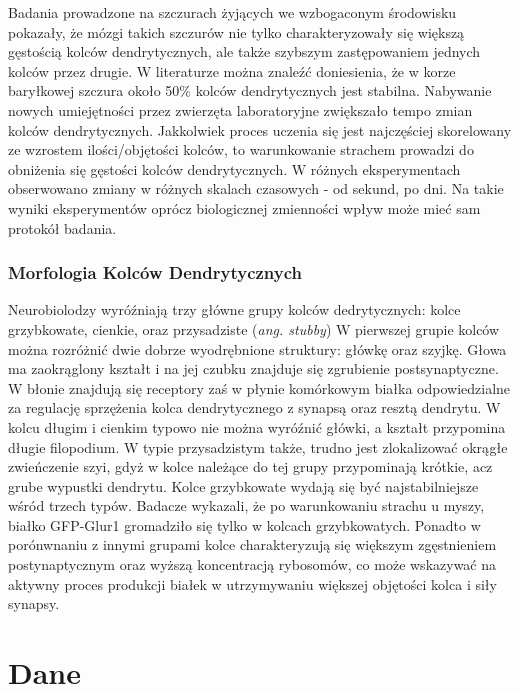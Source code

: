 \documentclass{article}
\begin{document}
Badania prowadzone na szczurach żyjących we wzbogaconym środowisku pokazały, że mózgi takich szczurów nie tylko charakteryzowały się większą gęstością kolców dendrytycznych, ale także szybszym zastępowaniem jednych kolców przez drugie.
W literaturze\citep{Sala2014} można znaleźć doniesienia, że w korze baryłkowej szczura około 50\% kolców dendrytycznych jest stabilna.
Nabywanie nowych umiejętności przez zwierzęta laboratoryjne zwiększało tempo zmian kolców dendrytycznych.
Jakkolwiek proces uczenia się jest najczęściej skorelowany ze wzrostem ilości/objętości kolców, to warunkowanie strachem prowadzi do obniżenia się gęstości kolców dendrytycznych.
W różnych eksperymentach obserwowano zmiany w różnych skalach czasowych - od sekund, po dni.
Na takie wyniki eksperymentów oprócz biologicznej zmienności wpływ może mieć sam protokół badania.


\subsubsection{Morfologia Kolców Dendrytycznych}
Neurobiolodzy wyróźniają trzy główne grupy kolców dedrytycznych: kolce grzybkowate, cienkie, oraz przysadziste (\emph{ang. stubby})
W pierwszej grupie kolców można rozróżnić dwie dobrze wyodrębnione struktury: główkę oraz szyjkę.
Głowa ma zaokrąglony kształt i na jej czubku znajduje się zgrubienie postsynaptyczne.
W błonie znajdują się receptory zaś w płynie komórkowym białka odpowiedzialne za regulację sprzężenia kolca dendrytycznego z synapsą oraz resztą dendrytu. %
W kolcu długim i cienkim typowo nie można wyróźnić główki, a kształt przypomina długie filopodium.
W typie przysadzistym także, trudno jest zlokalizować okrągłe zwieńczenie szyi, gdyż w kolce należące do tej grupy przypominają krótkie, acz grube wypustki dendrytu. %
Kolce grzybkowate wydają się być najstabilniejsze wśród trzech typów.
Badacze wykazali, że po warunkowaniu strachu u myszy, białko GFP-Glur1 gromadziło się tylko w kolcach grzybkowatych.
Ponadto w porónwnaniu z innymi grupami kolce charakteryzują się większym zgęstnieniem postynaptycznym oraz wyższą koncentracją rybosomów, co może wskazywać na aktywny proces produkcji białek w utrzymywaniu większej objętości kolca i siły synapsy\cite{Sala2014}.

\section{Dane}
\label{rozdzial_dane}
\end{document}
